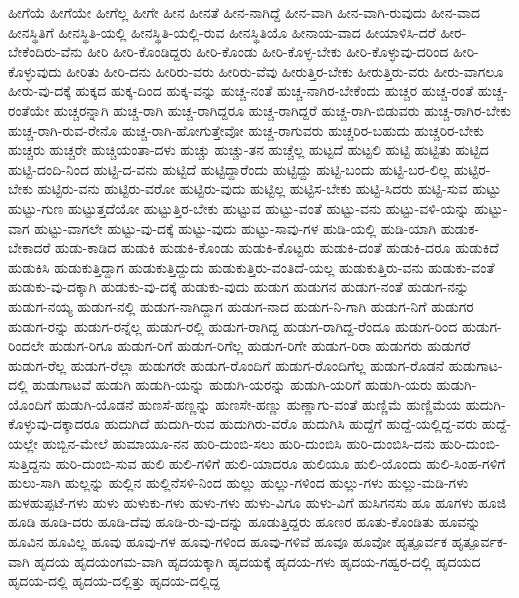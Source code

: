 {ಹೀಗೆಯೆ
ಹೀಗೆಯೇ
ಹೀಗೆಲ್ಲ
ಹೀಗೇ
ಹೀನ
ಹೀನತೆ
ಹೀನ-ನಾಗಿದ್ದೆ
ಹೀನ-ವಾಗಿ
ಹೀನ-ವಾಗಿ-ರುವುದು
ಹೀನ-ವಾದ
ಹೀನಸ್ಥಿತಿಗೆ
ಹೀನಸ್ಥಿತಿ-ಯಲ್ಲಿ
ಹೀನಸ್ಥಿತಿ-ಯಲ್ಲಿ-ರುವ
ಹೀನಸ್ಥಿತಿಯೊ
ಹೀನಾಯ-ವಾದ
ಹೀಯಾಳಿಸಿ-ದರೆ
ಹೀರ-ಬೇಕೆಂದಿರು-ವೆನು
ಹೀರಿ
ಹೀರಿ-ಕೊಂಡಿದ್ದರು
ಹೀರಿ-ಕೊಂಡು
ಹೀರಿ-ಕೊಳ್ಳ-ಬೇಕು
ಹೀರಿ-ಕೊಳ್ಳುವು-ದರಿಂದ
ಹೀರಿ-ಕೊಳ್ಳುವುದು
ಹೀರಿತು
ಹೀರಿ-ದನು
ಹೀರಿರು-ವರು
ಹೀರಿರು-ವೆವು
ಹೀರುತ್ತಿರ-ಬೇಕು
ಹೀರುತ್ತಿರು-ವರು
ಹೀರು-ವಾಗಲೂ
ಹೀರು-ವು-ದಕ್ಕೆ
ಹುಕ್ಕದ
ಹುಕ್ಕ-ದಿಂದ
ಹುಕ್ಕ-ವನ್ನು
ಹುಚ್ಚ-ನಂತೆ
ಹುಚ್ಚ-ನಾಗಿರ-ಬೇಕೆಂದು
ಹುಚ್ಚರ
ಹುಚ್ಚ-ರಂತೆ
ಹುಚ್ಚ-ರಂತೆಯೇ
ಹುಚ್ಚರನ್ನಾಗಿ
ಹುಚ್ಚ-ರಾಗಿ
ಹುಚ್ಚ-ರಾಗಿದ್ದರೂ
ಹುಚ್ಚ-ರಾಗಿದ್ದರೆ
ಹುಚ್ಚ-ರಾಗಿ-ಬಿಡುವರು
ಹುಚ್ಚ-ರಾಗಿರ-ಬೇಕು
ಹುಚ್ಚ-ರಾಗಿ-ರುವ-ರೇನೊ
ಹುಚ್ಚ-ರಾಗಿ-ಹೋಗುತ್ತೇವೋ
ಹುಚ್ಚ-ರಾಗುವರು
ಹುಚ್ಚರಿರ-ಬಹುದು
ಹುಚ್ಚರಿರ-ಬೇಕು
ಹುಚ್ಚರು
ಹುಚ್ಚರೇ
ಹುಚ್ಚಿಯಂತಾ-ದಳು
ಹುಚ್ಚು
ಹುಚ್ಚು-ತನ
ಹುಚ್ಚೆಲ್ಲ
ಹುಟ್ಟದೆ
ಹುಟ್ಟಲಿ
ಹುಟ್ಟಿ
ಹುಟ್ಟಿತು
ಹುಟ್ಟಿದ
ಹುಟ್ಟಿ-ದಂದಿ-ನಿಂದ
ಹುಟ್ಟಿ-ದ-ವನು
ಹುಟ್ಟಿದೆ
ಹುಟ್ಟಿದ್ದಾರೆಂದು
ಹುಟ್ಟಿದ್ದು
ಹುಟ್ಟಿ-ಬಂದು
ಹುಟ್ಟಿ-ಬರ-ಲಿಲ್ಲ
ಹುಟ್ಟಿರ-ಬೇಕು
ಹುಟ್ಟಿರು-ವನು
ಹುಟ್ಟಿರು-ವರೋ
ಹುಟ್ಟಿರು-ವುದು
ಹುಟ್ಟಿಲ್ಲ
ಹುಟ್ಟಿಸ-ಬೇಕು
ಹುಟ್ಟಿ-ಸಿದರು
ಹುಟ್ಟಿ-ಸುವ
ಹುಟ್ಟು
ಹುಟ್ಟು-ಗುಣ
ಹುಟ್ಟುತ್ತದೆಯೋ
ಹುಟ್ಟುತ್ತಿರ-ಬೇಕು
ಹುಟ್ಟುವ
ಹುಟ್ಟು-ವಂತೆ
ಹುಟ್ಟು-ವನು
ಹುಟ್ಟು-ವಳಿ-ಯನ್ನು
ಹುಟ್ಟು-ವಾಗ
ಹುಟ್ಟು-ವಾಗಲೇ
ಹುಟ್ಟು-ವು-ದಕ್ಕೆ
ಹುಟ್ಟು-ವುದು
ಹುಟ್ಟು-ಸಾವು-ಗಳ
ಹುಡಿ-ಯಲ್ಲಿ
ಹುಡಿ-ಯಾಗಿ
ಹುಡುಕ-ಬೇಕಾದರೆ
ಹುಡು-ಕಾಡಿದ
ಹುಡುಕಿ
ಹುಡುಕಿ-ಕೊಂಡು
ಹುಡುಕಿ-ಕೊಟ್ಟರು
ಹುಡುಕಿ-ದಂತೆ
ಹುಡುಕಿ-ದರೂ
ಹುಡುಕಿದೆ
ಹುಡುಕಿಸಿ
ಹುಡುಕುತ್ತಿದ್ದಾಗ
ಹುಡುಕುತ್ತಿದ್ದುದು
ಹುಡುಕುತ್ತಿರು-ವಂತಿದೆ-ಯಲ್ಲ
ಹುಡುಕುತ್ತಿರು-ವನು
ಹುಡುಕು-ವಂತೆ
ಹುಡುಕು-ವು-ದಕ್ಕಾಗಿ
ಹುಡುಕು-ವು-ದಕ್ಕೆ
ಹುಡುಕು-ವುದು
ಹುಡುಗ
ಹುಡುಗನ
ಹುಡುಗ-ನಂತೆ
ಹುಡುಗ-ನನ್ನು
ಹುಡುಗ-ನಯ್ಯ
ಹುಡುಗ-ನಲ್ಲಿ
ಹುಡುಗ-ನಾಗಿದ್ದಾಗ
ಹುಡುಗ-ನಾದ
ಹುಡುಗ-ನಿ-ಗಾಗಿ
ಹುಡುಗ-ನಿಗೆ
ಹುಡುಗರ
ಹುಡುಗ-ರನ್ನು
ಹುಡುಗ-ರನ್ನೆಲ್ಲ
ಹುಡುಗ-ರಲ್ಲಿ
ಹುಡುಗ-ರಾಗಿದ್ದ
ಹುಡುಗ-ರಾಗಿದ್ದ-ರೆಂದೂ
ಹುಡುಗ-ರಿಂದ
ಹುಡುಗ-ರಿಂದಲೇ
ಹುಡುಗ-ರಿಗೂ
ಹುಡುಗ-ರಿಗೆ
ಹುಡುಗ-ರಿಗೆಲ್ಲ
ಹುಡುಗ-ರಿಗೇ
ಹುಡುಗ-ರಿರಾ
ಹುಡುಗರು
ಹುಡುಗರೆ
ಹುಡುಗ-ರೆಲ್ಲ
ಹುಡುಗ-ರೆಲ್ಲಾ
ಹುಡುಗರೇ
ಹುಡುಗ-ರೊಂದಿಗೆ
ಹುಡುಗ-ರೊಂದಿಗೆಲ್ಲ
ಹುಡುಗ-ರೊಡನೆ
ಹುಡುಗಾಟ-ದಲ್ಲಿ
ಹುಡುಗಾಟವೆ
ಹುಡುಗಿ
ಹುಡುಗಿ-ಯನ್ನು
ಹುಡುಗಿ-ಯರನ್ನು
ಹುಡುಗಿ-ಯರಿಗೆ
ಹುಡುಗಿ-ಯರು
ಹುಡುಗಿ-ಯೊಂದಿಗೆ
ಹುಡುಗಿ-ಯೊಡನೆ
ಹುಣಸೆ-ಹಣ್ಣನ್ನು
ಹುಣಸೇ-ಹಣ್ಣು
ಹುಣ್ಣಾಗು-ವಂತೆ
ಹುಣ್ಣಿಮೆ
ಹುಣ್ಣಿಮೆಯ
ಹುದುಗಿ-ಕೊಳ್ಳುವು-ದಕ್ಕಾದರೂ
ಹುದುಗಿದೆ
ಹುದುಗಿ-ರುವ
ಹುದುಗಿರು-ವರೊ
ಹುದುಗಿಸಿ
ಹುದ್ದೆಗೆ
ಹುದ್ದೆ-ಯಲ್ಲಿದ್ದ-ವರು
ಹುದ್ದೆ-ಯಲ್ಲೇ
ಹುಬ್ಬಿನ-ಮೇಲೆ
ಹುಮಾಯೂ-ನನ
ಹುರಿ-ದುಂಬಿ-ಸಲು
ಹುರಿ-ದುಂಬಿಸಿ
ಹುರಿ-ದುಂಬಿಸಿ-ದನು
ಹುರಿ-ದುಂಬಿ-ಸುತ್ತಿದ್ದನು
ಹುರಿ-ದುಂಬಿ-ಸುವ
ಹುಲಿ
ಹುಲಿ-ಗಳಿಗೆ
ಹುಲಿ-ಯಾದರೂ
ಹುಲಿಯೂ
ಹುಲಿ-ಯೊಂದು
ಹುಲಿ-ಸಿಂಹ-ಗಳಿಗೆ
ಹುಲು-ಸಾಗಿ
ಹುಲ್ಲನ್ನು
ಹುಲ್ಲಿನ
ಹುಲ್ಲಿನೆಸಳಿ-ನಿಂದ
ಹುಲ್ಲು
ಹುಲ್ಲು-ಗಳಿಂದ
ಹುಲ್ಲು-ಗಳು
ಹುಲ್ಲು-ಮಡಿ-ಗಳು
ಹುಳಹುಪ್ಪಟೆ-ಗಳು
ಹುಳು
ಹುಳುಕು-ಗಳು
ಹುಳು-ಗಳು
ಹುಳು-ವಿಗೂ
ಹುಳು-ವಿಗೆ
ಹುಸಿಗನಸು
ಹೂ
ಹೂಗಳು
ಹೂಜಿ
ಹೂಡಿ
ಹೂಡಿ-ದರು
ಹೂಡಿ-ದೆವು
ಹೂಡಿ-ರು-ವು-ದನ್ನು
ಹೂಡುತ್ತಿದ್ದರು
ಹೂಣರ
ಹೂತು-ಕೊಂಡಿತು
ಹೂವನ್ನು
ಹೂವಿನ
ಹೂವಿಲ್ಲ
ಹೂವು
ಹೂವು-ಗಳ
ಹೂವು-ಗಳಿಂದ
ಹೂವು-ಗಳಿವೆ
ಹೂವೂ
ಹೂವೋ
ಹೃತ್ಪೂರ್ವಕ
ಹೃತ್ಪೂರ್ವಕ-ವಾಗಿ
ಹೃದಯ
ಹೃದಯಂಗಮ-ವಾಗಿ
ಹೃದಯಕ್ಕಾಗಿ
ಹೃದಯಕ್ಕೆ
ಹೃದಯ-ಗಳು
ಹೃದಯ-ಗಹ್ವರ-ದಲ್ಲಿ
ಹೃದಯದ
ಹೃದಯ-ದಲ್ಲಿ
ಹೃದಯ-ದಲ್ಲಿತ್ತು
ಹೃದಯ-ದಲ್ಲಿದ್ದ
}
